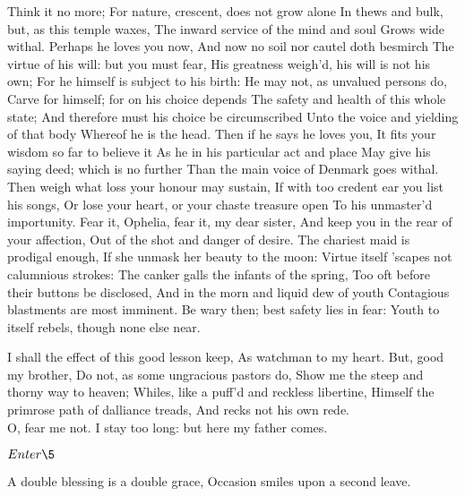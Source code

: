 \documentclass[11pt]{book}
\begin{document}
\7	Think it no more;
	For nature, crescent, does not grow alone
	In thews and bulk, but, as this temple waxes,
	The inward service of the mind and soul
	Grows wide withal. Perhaps he loves you now,
	And now no soil nor cautel doth besmirch
	The virtue of his will: but you must fear,
	His greatness weigh'd, his will is not his own;
	For he himself is subject to his birth:
	He may not, as unvalued persons do,
	Carve for himself; for on his choice depends
	The safety and health of this whole state;
	And therefore must his choice be circumscribed
	Unto the voice and yielding of that body
	Whereof he is the head. Then if he says he loves you,
	It fits your wisdom so far to believe it
	As he in his particular act and place
	May give his saying deed; which is no further
	Than the main voice of Denmark goes withal.
	Then weigh what loss your honour may sustain,
	If with too credent ear you list his songs,
	Or lose your heart, or your chaste treasure open
	To his unmaster'd importunity.
	Fear it, Ophelia, fear it, my dear sister,
	And keep you in the rear of your affection,
	Out of the shot and danger of desire.
	The chariest maid is prodigal enough,
	If she unmask her beauty to the moon:
	Virtue itself 'scapes not calumnious strokes:
	The canker galls the infants of the spring,
	Too oft before their buttons be disclosed,
	And in the morn and liquid dew of youth
	Contagious blastments are most imminent.
	Be wary then; best safety lies in fear:
	Youth to itself rebels, though none else near.

\4	I shall the effect of this good lesson keep,
	As watchman to my heart. But, good my brother,
	Do not, as some ungracious pastors do,
	Show me the steep and thorny way to heaven;
	Whiles, like a puff'd and reckless libertine,
	Himself the primrose path of dalliance treads,
	And recks not his own rede. \\

\7	O, fear me not.
	I stay too long: but here my father comes.

	\(Enter \5\)

	A double blessing is a double grace,
	Occasion smiles upon a second leave.
\end{document}
